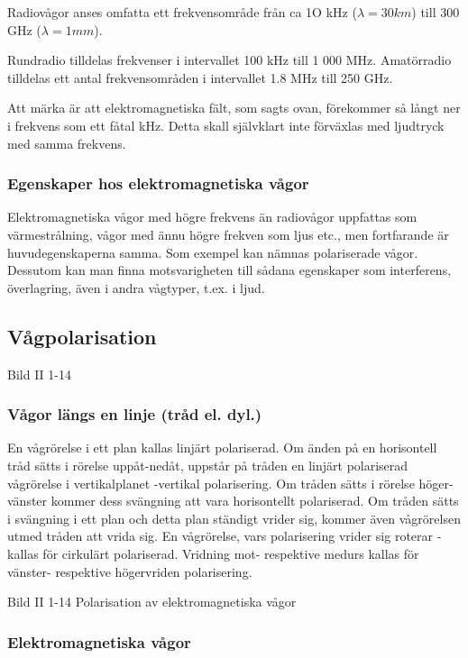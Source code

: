 Radiovågor anses omfatta ett frekvensområde från ca 1O kHz (\(\lambda = 30 km\)) till 300
GHz (\(\lambda = 1 mm\)).

Rundradio tilldelas frekvenser i intervallet 100 kHz till 1 000 MHz. Amatörradio tilldelas
ett antal frekvensområden i intervallet 1.8 MHz till 250 GHz.

Att märka är att elektromagnetiska fält, som sagts ovan, förekommer så långt ner i
frekvens som ett fåtal kHz. Detta skall självklart inte förväxlas med ljudtryck med samma
frekvens.

\subsubsection{Egenskaper hos elektromagnetiska vågor}

Elektromagnetiska vågor med högre frekvens än radiovågor uppfattas som värmestrålning,
vågor med ännu högre frekven som ljus etc., men fortfarande är huvudegenskaperna samma.
Som exempel kan nämnas polariserade vågor. Dessutom kan
man finna motsvarigheten till sådana egenskaper som interferens, överlagring, även i
andra vågtyper, t.ex. i ljud.

\subsection{Vågpolarisation}

Bild II 1-14

\subsubsection{Vågor längs en linje (tråd el. dyl.)}
En vågrörelse i ett plan kallas linjärt polariserad. Om änden på en horisontell tråd sätts
i rörelse uppåt-nedåt, uppstår på tråden en linjärt polariserad vågrörelse i vertikalplanet
-vertikal polarisering.
Om tråden sätts i rörelse höger-vänster kommer dess svängning att vara horisontellt
polariserad.
Om tråden sätts i svängning i ett plan och detta plan ständigt vrider sig, kommer även
vågrörelsen utmed tråden att vrida sig. En vågrörelse, vars polarisering vrider sig
roterar - kallas för cirkulärt polariserad. Vridning mot- respektive medurs kallas för
vänster- respektive högervriden polarisering.

Bild II 1-14 Polarisation av elektromagnetiska vågor

\subsubsection{Elektromagnetiska vågor}

